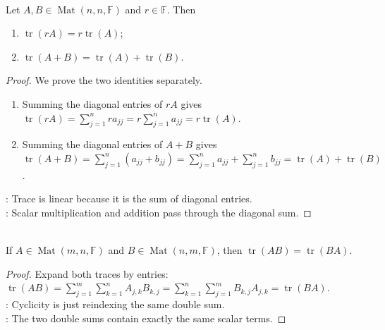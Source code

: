 \begin{proposition} \label{prop:trace-arithmetic} \\
Let $A,B\in\operatorname{Mat}(n,n,\mathbb{F})$ and $r\in\mathbb{F}$. Then
\begin{enumerate}[label=(\roman*)]
\setlength{\itemsep}{0pt}
\item $\operatorname{tr}(rA)=r\operatorname{tr}(A)$;
\item $\operatorname{tr}(A+B)=\operatorname{tr}(A)+\operatorname{tr}(B)$.
\end{enumerate}
\begin{proof}
We prove the two identities separately.
\begin{enumerate}[label=(\roman*)]
\setlength{\itemsep}{0pt}
\item Summing the diagonal entries of $rA$ gives $\operatorname{tr}(rA)=\sum\limits_{j=1}^{n}ra_{jj}=r\sum\limits_{j=1}^{n}a_{jj}=r\operatorname{tr}(A)$.
\item Summing the diagonal entries of $A+B$ gives $\operatorname{tr}(A+B)=\sum\limits_{j=1}^{n}(a_{jj}+b_{jj}) =\sum\limits_{j=1}^{n}a_{jj}+\sum_{j=1}^{n}b_{jj} =\operatorname{tr}(A)+\operatorname{tr}(B)$.
\end{enumerate}
: Trace is linear because it is the sum of diagonal entries.\\
: Scalar multiplication and addition pass through the diagonal sum.
\end{proof}
\end{proposition}

\begin{proposition} \label{prop:trace-cyclicity-two-factors} \\
If $A\in\operatorname{Mat}(m,n,\mathbb{F})$ and $B\in\operatorname{Mat}(n,m,\mathbb{F})$, then $\operatorname{tr}(AB)=\operatorname{tr}(BA)$.
\begin{proof}
Expand both traces by entries: $\operatorname{tr}(AB) =\sum\limits_{j=1}^{m}\sum\limits_{k=1}^{n}A_{j,k}B_{k,j} =\sum\limits_{k=1}^{n}\sum\limits_{j=1}^{m}B_{k,j}A_{j,k} =\operatorname{tr}(BA)$.\\
: Cyclicity is just reindexing the same double sum.\\
: The two double sums contain exactly the same scalar terms.
\end{proof}
\end{proposition}

